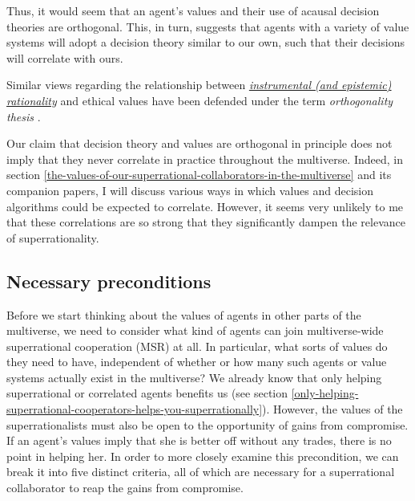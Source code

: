 Thus, it would seem that an agent's values and their use of acausal
decision theories are orthogonal. This, in turn, suggests that agents
with a variety of value systems will adopt a decision theory similar to
our own, such that their decisions will correlate with ours.

Similar views regarding the relationship between
\href{http://lesswrong.com/lw/31/what_do_we_mean_by_rationality/}{\emph{instrumental
(and epistemic) rationality}} and ethical values have been defended
under the term \emph{orthogonality thesis}
\parencite{Bostrom2014-pc,Bostrom2012-hj,Armstrong2013-xo}.

Our claim that decision theory and values are orthogonal in principle
does not imply that they never correlate in practice throughout the
multiverse. Indeed, in section
\ref{the-values-of-our-superrational-collaborators-in-the-multiverse} and its
companion papers, I will discuss various ways in which values and
decision algorithms could be expected to correlate. However, it seems
very unlikely to me that these correlations are so strong that they
significantly dampen the relevance of superrationality.

\hypertarget{necessary-preconditions}{\subsection{Necessary
preconditions}\label{necessary-preconditions}}

Before we start thinking about the values of agents in other parts of
the multiverse, we need to consider what kind of agents can join
multiverse-wide superrational cooperation (MSR) at all. In particular,
what sorts of values do they need to have, independent of whether or how
many such agents or value systems actually exist in the multiverse? We
already know that only helping superrational or correlated agents
benefits us (see section
\ref{only-helping-superrational-cooperators-helps-you-superrationally}).
However, the values of the superrationalists must also be open to the
opportunity of gains from compromise. If an agent's values imply that
she is better off without any trades, there is no point in helping her.
In order to more closely examine this precondition, we can break it into
five distinct criteria, all of which are necessary for a superrational
collaborator to reap the gains from compromise.

